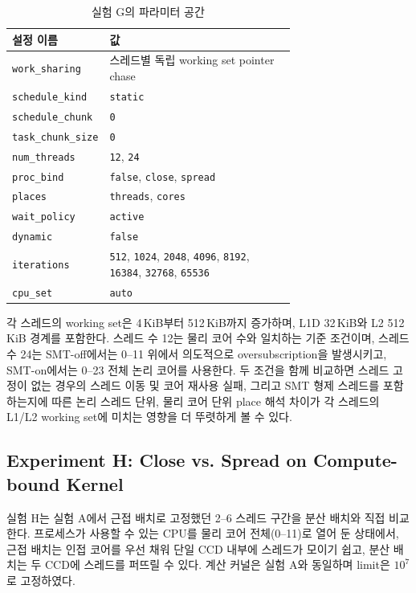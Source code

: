 \documentclass[11pt,a4paper]{article}
\begin{document}
\begin{table}[h]
\centering
\begin{tabular}{lp{0.70\linewidth}}
\toprule
설정 이름 & 값 \\
\midrule
\texttt{work\_sharing} & 스레드별 독립 working set pointer chase \\
\texttt{schedule\_kind} & \texttt{static} \\
\texttt{schedule\_chunk} & \texttt{0} \\
\texttt{task\_chunk\_size} & \texttt{0} \\
\texttt{num\_threads} & \texttt{12}, \texttt{24} \\
\texttt{proc\_bind} & \texttt{false}, \texttt{close}, \texttt{spread} \\
\texttt{places} & \texttt{threads}, \texttt{cores} \\
\texttt{wait\_policy} & \texttt{active} \\
\texttt{dynamic} & \texttt{false} \\
\texttt{iterations} & \texttt{512}, \texttt{1024}, \texttt{2048}, \texttt{4096}, \texttt{8192}, \texttt{16384}, \texttt{32768}, \texttt{65536} \\
\texttt{cpu\_set} & \texttt{auto} \\
\bottomrule
\end{tabular}
\caption{실험 G의 파라미터 공간}
\label{tab:expG-space}
\end{table}

각 스레드의 working set은 4\,KiB부터 512\,KiB까지 증가하며, L1D 32\,KiB와 L2 512\,KiB 경계를 포함한다. 스레드 수 12는 물리 코어 수와 일치하는 기준 조건이며, 스레드 수 24는 SMT-off에서는 0--11 위에서 의도적으로 oversubscription을 발생시키고, SMT-on에서는 0--23 전체 논리 코어를 사용한다. 두 조건을 함께 비교하면 스레드 고정이 없는 경우의 스레드 이동 및 코어 재사용 실패, 그리고 SMT 형제 스레드를 포함하는지에 따른 논리 스레드 단위, 물리 코어 단위 place 해석 차이가 각 스레드의 L1/L2 working set에 미치는 영향을 더 뚜렷하게 볼 수 있다.

\subsection{Experiment H: Close vs. Spread on Compute-bound Kernel}

실험 H는 실험 A에서 근접 배치로 고정했던 2--6 스레드 구간을 분산 배치와 직접 비교한다. 프로세스가 사용할 수 있는 CPU를 물리 코어 전체(0--11)로 열어 둔 상태에서, 근접 배치는 인접 코어를 우선 채워 단일 CCD 내부에 스레드가 모이기 쉽고, 분산 배치는 두 CCD에 스레드를 퍼뜨릴 수 있다. 계산 커널은 실험 A와 동일하며 limit은 $10^7$로 고정하였다.
\end{document}
